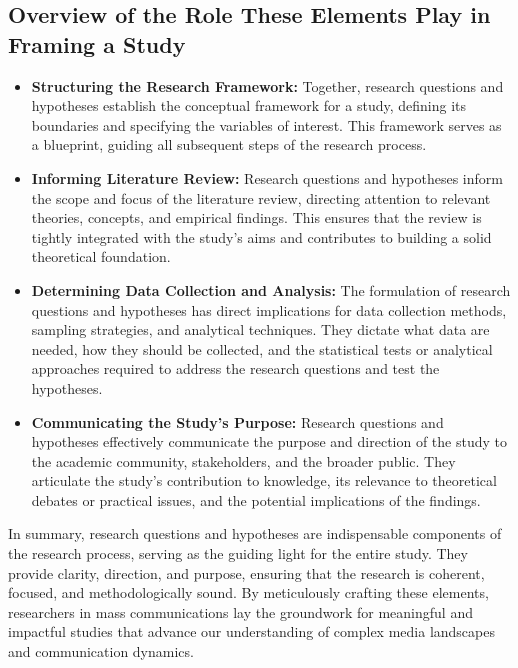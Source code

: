 \documentclass[
]{book}
\begin{document}
\hypertarget{overview-of-the-role-these-elements-play-in-framing-a-study}{%
\subsection{Overview of the Role These Elements Play in Framing a Study}\label{overview-of-the-role-these-elements-play-in-framing-a-study}}

\begin{itemize}
\item
  \textbf{Structuring the Research Framework:} Together, research questions and hypotheses establish the conceptual framework for a study, defining its boundaries and specifying the variables of interest. This framework serves as a blueprint, guiding all subsequent steps of the research process.
\item
  \textbf{Informing Literature Review:} Research questions and hypotheses inform the scope and focus of the literature review, directing attention to relevant theories, concepts, and empirical findings. This ensures that the review is tightly integrated with the study's aims and contributes to building a solid theoretical foundation.
\item
  \textbf{Determining Data Collection and Analysis:} The formulation of research questions and hypotheses has direct implications for data collection methods, sampling strategies, and analytical techniques. They dictate what data are needed, how they should be collected, and the statistical tests or analytical approaches required to address the research questions and test the hypotheses.
\item
  \textbf{Communicating the Study's Purpose:} Research questions and hypotheses effectively communicate the purpose and direction of the study to the academic community, stakeholders, and the broader public. They articulate the study's contribution to knowledge, its relevance to theoretical debates or practical issues, and the potential implications of the findings.
\end{itemize}

In summary, research questions and hypotheses are indispensable components of the research process, serving as the guiding light for the entire study. They provide clarity, direction, and purpose, ensuring that the research is coherent, focused, and methodologically sound. By meticulously crafting these elements, researchers in mass communications lay the groundwork for meaningful and impactful studies that advance our understanding of complex media landscapes and communication dynamics.
\end{document}
